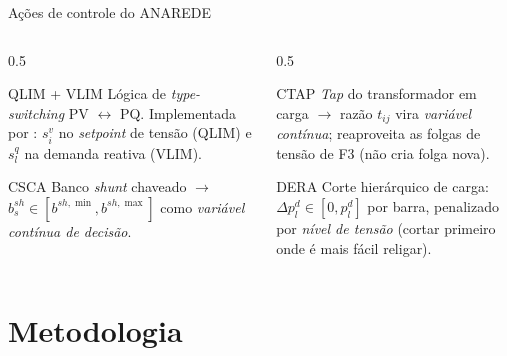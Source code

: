 \documentclass{libs/ufc_format}
\begin{document}
\begin{frame}{Ações de controle do ANAREDE}
    \begin{columns}
        \begin{column}{0.5\textwidth}
            \begin{block}{QLIM + VLIM}
                Lógica de \emph{type-switching} PV $\leftrightarrow$ PQ. Implementada por : $s^v_i$ no \textit{setpoint} de tensão (QLIM) e $s^q_l$ na demanda reativa (VLIM).
            \end{block}
            \begin{block}{CSCA}
                Banco \textit{shunt} chaveado $\rightarrow$ $b^{sh}_s \in [b^{sh,\min}, b^{sh,\max}]$ como \emph{variável contínua de decisão}.
            \end{block}
        \end{column}
        \begin{column}{0.5\textwidth}
            \begin{block}{CTAP}
                \textit{Tap} do transformador em carga $\rightarrow$ razão $t_{ij}$ vira \emph{variável contínua}; reaproveita as folgas de tensão de F3 (não cria folga nova).
            \end{block}
            \begin{block}{DERA}
                Corte hierárquico de carga: $\Delta p^d_l \in [0, p^d_l]$ por barra, penalizado por \emph{nível de tensão} (cortar primeiro onde é mais fácil religar).
            \end{block}
        \end{column}
    \end{columns}

    \vspace{0.3cm}
\end{frame}

\section{Metodologia}
\end{document}
